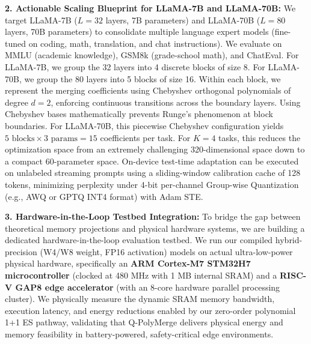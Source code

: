 \textbf{2. Actionable Scaling Blueprint for LLaMA-7B and LLaMA-70B:}
We target LLaMA-7B ($L=32$ layers, 7B parameters) and LLaMA-70B ($L=80$ layers, 70B parameters) to consolidate multiple language expert models (fine-tuned on coding, math, translation, and chat instructions). We evaluate on MMLU (academic knowledge), GSM8k (grade-school math), and ChatEval.
For LLaMA-7B, we group the 32 layers into 4 discrete blocks of size 8. For LLaMA-70B, we group the 80 layers into 5 blocks of size 16. Within each block, we represent the merging coefficients using Chebyshev orthogonal polynomials of degree $d=2$, enforcing continuous transitions across the boundary layers. 
Using Chebyshev bases mathematically prevents Runge's phenomenon at block boundaries. For LLaMA-70B, this piecewise Chebyshev configuration yields $5 \text{ blocks} \times 3 \text{ params} = 15$ coefficients per task. For $K=4$ tasks, this reduces the optimization space from an extremely challenging 320-dimensional space down to a compact 60-parameter space. On-device test-time adaptation can be executed on unlabeled streaming prompts using a sliding-window calibration cache of 128 tokens, minimizing perplexity under 4-bit per-channel Group-wise Quantization (e.g., AWQ or GPTQ INT4 format) with Adam STE.

\textbf{3. Hardware-in-the-Loop Testbed Integration:}
To bridge the gap between theoretical memory projections and physical hardware systems, we are building a dedicated hardware-in-the-loop evaluation testbed. We run our compiled hybrid-precision (W4/W8 weight, FP16 activation) models on actual ultra-low-power physical hardware, specifically an \textbf{ARM Cortex-M7 STM32H7 microcontroller} (clocked at 480 MHz with 1 MB internal SRAM) and a \textbf{RISC-V GAP8 edge accelerator} (with an 8-core hardware parallel processing cluster). We physically measure the dynamic SRAM memory bandwidth, execution latency, and energy reductions enabled by our zero-order polynomial 1+1 ES pathway, validating that Q-PolyMerge delivers physical energy and memory feasibility in battery-powered, safety-critical edge environments.

